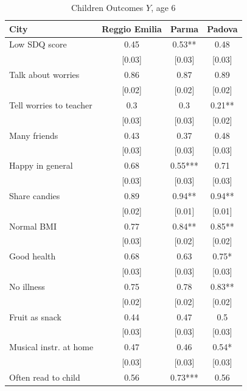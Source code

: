 \documentclass[12pt]{article}
\begin{document}
\begin{table}[ht]
\caption{Children Outcomes $Y$, age 6}
\label{tab:childOutcomes}
\begin{center}
    \begin{tabular}{lccc}
    \hline \hline
    City  & Reggio Emilia & Parma & Padova \\
    \hline

    Low SDQ score & 0.45  & 0.53** & 0.48 \\
          & [0.03] & [0.03] & [0.03] \\
    Talk about worries & 0.86  & 0.87  & 0.89 \\
          & [0.02] & [0.02] & [0.02] \\
    Tell worries to teacher & 0.3   & 0.3   & 0.21** \\
          & [0.03] & [0.03] & [0.02] \\
    Many friends & 0.43  & 0.37  & 0.48 \\
          & [0.03] & [0.03] & [0.03] \\
    Happy in general & 0.68  & 0.55*** & 0.71 \\
          & [0.03] & [0.03] & [0.03] \\
    Share candies & 0.89  & 0.94** & 0.94** \\
          & [0.02] & [0.01] & [0.01] \\
    Normal BMI & 0.77  & 0.84** & 0.85** \\
          & [0.03] & [0.02] & [0.02] \\
    Good health & 0.68  & 0.63  & 0.75* \\
          & [0.03] & [0.03] & [0.03] \\
    No illness & 0.75  & 0.78  & 0.83** \\
          & [0.02] & [0.02] & [0.02] \\
    Fruit as snack & 0.44  & 0.47  & 0.5 \\
          & [0.03] & [0.03] & [0.03] \\
    Musical instr. at home & 0.47  & 0.46  & 0.54* \\
          & [0.03] & [0.03] & [0.03] \\
    Often read to child & 0.56  & 0.73*** & 0.56 \\

\end{tabular}
\end{center}
\end{table}
\end{document}
